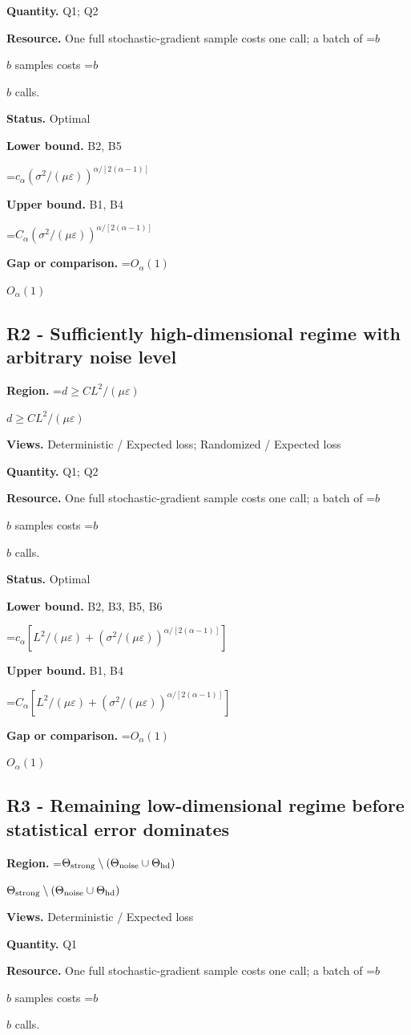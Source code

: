 \documentclass[10pt,a4paper]{article}
\newcommand{\AtlasMath}[1]{\par\begingroup\centering\setbox0=\hbox{$\displaystyle #1$}\ifdim\wd0>1.4\linewidth\typeout{ATLAS WIDE FORMULA: \the\wd0}\fi\ifdim\wd0>\linewidth\resizebox{\linewidth}{!}{\box0}\else\box0\fi\par\endgroup}
\newcommand{\AtlasInlineMath}[1]{\begingroup\setbox0=\hbox{$#1$}\ifdim\wd0>.4\linewidth\endgroup\AtlasMath{#1}\else\endgroup$#1$\fi}
\begin{document}
\textbf{Quantity.} Q1; Q2

\textbf{Resource.} One full stochastic-gradient sample costs one call; a batch of \AtlasInlineMath{b} samples costs \AtlasInlineMath{b} calls.

\textbf{Status.} Optimal

\textbf{Lower bound.} B2, B5

\AtlasMath{c_\alpha (\sigma^2/(\mu\varepsilon))^{\alpha/[2(\alpha-1)]}}
\textbf{Upper bound.} B1, B4

\AtlasMath{C_\alpha (\sigma^2/(\mu\varepsilon))^{\alpha/[2(\alpha-1)]}}
\textbf{Gap or comparison.} \AtlasInlineMath{O_\alpha(1)}

\subsection{R2 - Sufficiently high-dimensional regime with arbitrary noise level}
\textbf{Region.} \AtlasInlineMath{d\ge C L^2/(\mu\varepsilon)}

\textbf{Views.} Deterministic / Expected loss; Randomized / Expected loss

\textbf{Quantity.} Q1; Q2

\textbf{Resource.} One full stochastic-gradient sample costs one call; a batch of \AtlasInlineMath{b} samples costs \AtlasInlineMath{b} calls.

\textbf{Status.} Optimal

\textbf{Lower bound.} B2, B3, B5, B6

\AtlasMath{c_\alpha[L^2/(\mu\varepsilon)+(\sigma^2/(\mu\varepsilon))^{\alpha/[2(\alpha-1)]}]}
\textbf{Upper bound.} B1, B4

\AtlasMath{C_\alpha[L^2/(\mu\varepsilon)+(\sigma^2/(\mu\varepsilon))^{\alpha/[2(\alpha-1)]}]}
\textbf{Gap or comparison.} \AtlasInlineMath{O_\alpha(1)}

\subsection{R3 - Remaining low-dimensional regime before statistical error dominates}
\textbf{Region.} \AtlasInlineMath{\Theta_{\rm strong}\setminus(\Theta_{\rm noise}\cup\Theta_{\rm hd})}

\textbf{Views.} Deterministic / Expected loss

\textbf{Quantity.} Q1

\textbf{Resource.} One full stochastic-gradient sample costs one call; a batch of \AtlasInlineMath{b} samples costs \AtlasInlineMath{b} calls.
\end{document}
